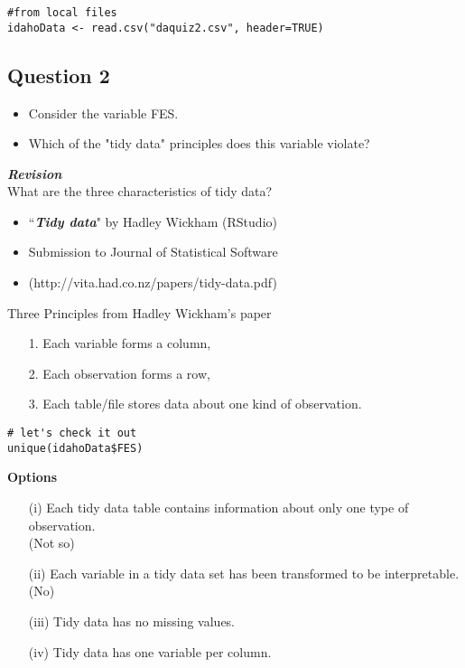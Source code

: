 \documentclass[]{article}
\begin{document}
\begin{framed}
\begin{verbatim}
#from local files
idahoData <- read.csv("daquiz2.csv", header=TRUE)

\end{verbatim}
\end{framed}

\newpage
\subsection*{ Question 2}

\begin{itemize}
\item Consider the variable FES. 
\item Which of the "tidy data" principles does this variable violate?
\end{itemize}

\textbf{\textit{Revision}}\\
What are the three characteristics of tidy data?

\begin{itemize}
\item ``\textit{\textbf{Tidy data}}" by Hadley Wickham (RStudio)
\item Submission to Journal of Statistical Software
\item (http://vita.had.co.nz/papers/tidy-data.pdf)
\end{itemize}
Three Principles from Hadley Wickham's paper
\begin{itemize}
\item[1.] Each variable forms a column, 
\item[2.] Each observation forms a row, 
\item[3.] Each table/file stores data about one kind of observation.
\end{itemize}

\begin{framed} 
\begin{verbatim}
# let's check it out
unique(idahoData$FES)
\end{verbatim}
\end{framed} 
\textbf{Options}
\begin{itemize}
\item[(i)]  Each tidy data table contains information about only one type of observation.\\
(Not so)

\item[(ii)]  Each variable in a tidy data set has been transformed to be interpretable.
(No)

\item[(iii)]  Tidy data has no missing values.

\item[(iv)]  Tidy data has one variable per column.
\end{itemize}
  
\end{document}
